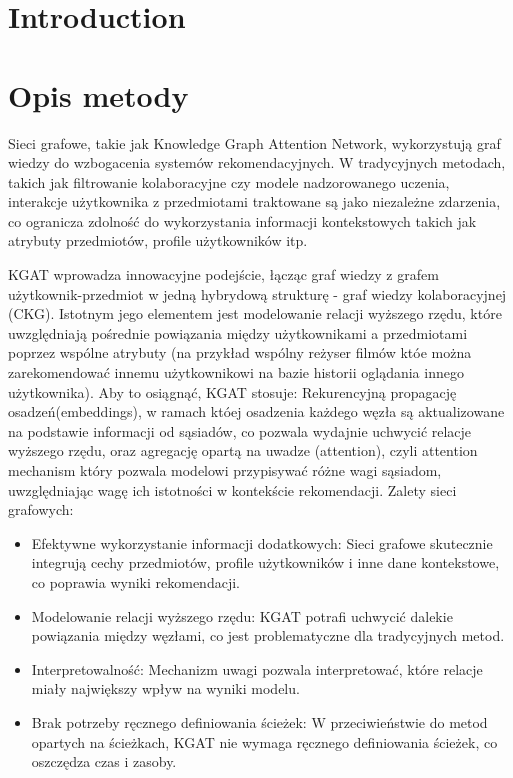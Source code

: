 \documentclass[a4paper]{LTJournalArticle}
\begin{document}
	\section{Introduction}
	
	\section{Opis metody}
	Sieci grafowe, takie jak Knowledge Graph Attention Network, wykorzystują graf wiedzy  do wzbogacenia systemów rekomendacyjnych. W tradycyjnych metodach, takich jak filtrowanie kolaboracyjne
	czy modele nadzorowanego uczenia, interakcje użytkownika z przedmiotami traktowane są jako niezależne zdarzenia, co ogranicza zdolność do wykorzystania informacji kontekstowych takich jak atrybuty przedmiotów, profile użytkowników itp.

KGAT wprowadza innowacyjne podejście, łącząc graf wiedzy z grafem użytkownik-przedmiot w jedną hybrydową strukturę - graf wiedzy kolaboracyjnej (CKG). 
Istotnym jego elementem jest modelowanie relacji wyższego rzędu, które uwzględniają pośrednie powiązania między użytkownikami a przedmiotami poprzez wspólne atrybuty 
(na przykład wspólny reżyser filmów któe można zarekomendować innemu użytkownikowi na bazie historii oglądania innego użytkownika). 
Aby to osiągnąć, KGAT stosuje:
Rekurencyjną propagację osadzeń(embeddings), w ramach któej osadzenia każdego węzła są aktualizowane na podstawie informacji od sąsiadów, co pozwala wydajnie uchwycić relacje wyższego rzędu, oraz 
agregację opartą na uwadze (attention), czyli attention mechanism który pozwala modelowi przypisywać różne wagi sąsiadom, uwzględniając wagę ich istotności w kontekście rekomendacji.
Zalety sieci grafowych:
\begin{itemize}
	\item Efektywne wykorzystanie informacji dodatkowych: Sieci grafowe skutecznie integrują cechy przedmiotów, profile użytkowników i inne dane kontekstowe, co poprawia wyniki rekomendacji.
\item Modelowanie relacji wyższego rzędu: KGAT potrafi uchwycić dalekie powiązania między węzłami, co jest problematyczne dla tradycyjnych metod.
\item Interpretowalność: Mechanizm uwagi pozwala interpretować, które relacje miały największy wpływ na wyniki modelu.
\item Brak potrzeby ręcznego definiowania ścieżek: W przeciwieństwie do metod opartych na ścieżkach, KGAT nie wymaga ręcznego definiowania ścieżek, co oszczędza czas i zasoby.
\end{itemize}
\end{document}
